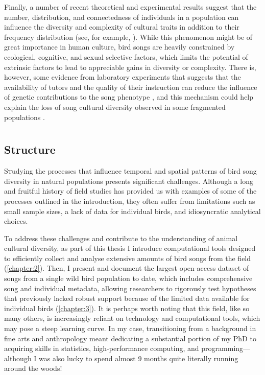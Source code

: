 Finally, a number of recent theoretical and experimental results suggest that the number, distribution, and connectedness of individuals in a population can influence the diversity and complexity of cultural traits in addition to their frequency distribution (see, for example, \cite{creanza2017,derex2018,derex2016,kempe2014}). While this phenomenon might be of great importance in human culture, bird songs are heavily constrained by ecological, cognitive, and sexual selective factors, which limits the potential of extrinsic factors to lead to appreciable gains in diversity or complexity. There is, however, some evidence from laboratory experiments that suggests that the availability of tutors and the quality of their instruction can reduce the influence of genetic contributions to the song phenotype \autocite{mets2017,mets2019}, and this mechanism could help explain the loss of song cultural diversity observed in some fragmented populations \autocite{hart2018,paxton2019}.

{\let\clearpage\relax\chapter*{}}

\section{Structure}
\lettrine[lines=2]Studying the processes that influence temporal and spatial patterns of bird song diversity in natural populations presents significant challenges. Although a long and fruitful history of field studies has provided us with examples of some of the processes outlined in the introduction, they often suffer from limitations such as small sample sizes, a lack of data for individual birds, and idiosyncratic analytical choices.

To address these challenges and contribute to the understanding of animal cultural diversity, as part of this thesis I introduce computational tools designed to efficiently collect and analyse extensive amounts of bird songs from the field (\autoref{chapter:2}). Then, I present and document the largest open-access dataset of songs from a single wild bird population to date, which includes comprehensive song and individual metadata, allowing researchers to rigorously test hypotheses that previously lacked robust support because of the limited data available for individual birds (\autoref{chapter:3}). It is perhaps worth noting that this field, like so many others, is increasingly reliant on technology and computational tools, which may pose a steep learning curve. In my case, transitioning from a background in fine arts and anthropology meant dedicating a substantial portion of my PhD to acquiring skills in statistics, high-performance computing, and programming---although I was also lucky to spend almost 9 months quite literally running around the woods!

